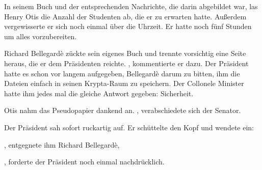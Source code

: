 In seinem Buch und der entsprechenden Nachrichte, die darin abgebildet war, las Henry Otis die Anzahl der Studenten ab, die er zu erwarten hatte. Außerdem vergewisserte er sich noch einmal über die Uhrzeit. Er hatte noch fünf Stunden um alles vorzubereiten.

\par

Richard Bellegardè zückte sein eigenes Buch und trennte vorsichtig eine Seite heraus, die er dem Präsidenten reichte. , kommentierte er dazu. Der Präsident hatte es schon vor langem aufgegeben, Bellegardè darum zu bitten, ihm die Dateien einfach in seinen Krypta-Raum zu speichern. Der Collonele Minister hatte ihm jedes mal die gleiche Antwort gegeben: Sicherheit.

\par

Otis nahm das Pseudopapier dankend an. , verabschiedete sich der Senator.

\par

Der Präsident sah sofort ruckartig auf. Er schüttelte den Kopf und wendete ein: 

\par

, entgegnete ihm Richard  Bellegardè, 

\par

, forderte der Präsident noch einmal nachdrücklich.

\par

